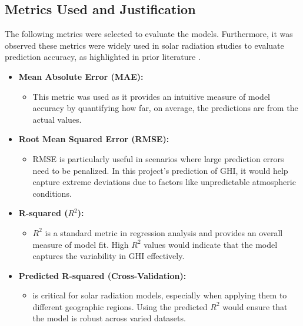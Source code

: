 \documentclass[10pt,twocolumn]{article}
\begin{document}
\begin{itemize}
\subsection*{Metrics Used and Justification}

The following metrics were selected to evaluate the models. Furthermore, it was observed these metrics were widely used in solar radiation studies to evaluate prediction accuracy, as highlighted in prior literature \cite{4}\cite{3}\cite{5}.
\begin{itemize}
    \item \textbf{Mean Absolute Error (MAE):}
    \begin{itemize}
        \item This metric was used as it provides an intuitive measure of model accuracy by quantifying how far, on average, the predictions are from the actual values. 
    \end{itemize}

    \item \textbf{Root Mean Squared Error (RMSE):}
    \begin{itemize}
        \item  RMSE is particularly useful in scenarios where large prediction errors need to be penalized. In this project's prediction of GHI, it would help capture extreme deviations due to factors like unpredictable atmospheric conditions.
    \end{itemize}

    \item \textbf{R-squared (\( R^2 \)):}
    \begin{itemize}
        \item \textbf \( R^2 \) is a standard metric in regression analysis and provides an overall measure of model fit. High \( R^2 \) values would indicate that the model captures the variability in GHI effectively.
    \end{itemize}

    \item \textbf{Predicted R-squared (Cross-Validation):}
    \begin{itemize}
        \item \Generalizability is critical for solar radiation models, especially when applying them to different geographic regions. Using the predicted \( R^2 \) would ensure that the model is robust across varied datasets.
    \end{itemize}
\end{itemize}


\end{itemize}
\end{document}
